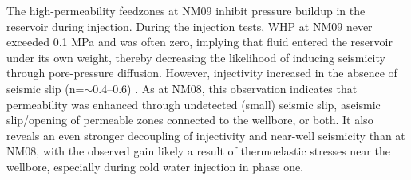 The high-permeability feedzones at NM09 inhibit pressure buildup in the reservoir during injection. During the injection tests, WHP at NM09 never exceeded 0.1 MPa and was often zero, implying that fluid entered the reservoir under its own weight, thereby decreasing the likelihood of inducing seismicity through pore-pressure diffusion. However, injectivity increased in the absence of seismic slip (n=$\sim$0.4--0.6) \citep{Clearwater_2015}. As at NM08, this observation indicates that permeability was enhanced through undetected (small) seismic slip, aseismic slip\slash{opening} of permeable zones connected to the wellbore, or both. It also reveals an even stronger decoupling of injectivity and near-well seismicity than at NM08, with the observed gain likely a result of thermoelastic stresses near the wellbore, especially during cold water injection in phase one.
